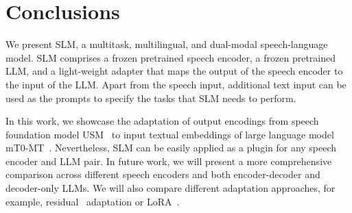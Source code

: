 \section{Conclusions}
\label{sec:conclusions}

We present SLM, a multitask, multilingual, and dual-modal speech-language model. SLM comprises a frozen pretrained speech encoder, a frozen pretrained LLM, and a light-weight adapter that maps the output of the speech encoder to the input of the LLM. Apart from the speech input, additional text input can be used as the prompts to specify the tasks that SLM needs to perform. 

In this work, we showcase the adaptation of output encodings from speech foundation model USM~\cite{zhang2023google} to input textual embeddings of large language model mT0-MT~\cite{muennighoff2022crosslingual}. Nevertheless, SLM can be easily applied as a plugin for any speech encoder and LLM pair. In future work, we will present a more comprehensive comparison across different speech encoders and both encoder-decoder and decoder-only LLMs. We will also compare different adaptation approaches, for example, residual~\cite{houlsby_etal-2019} adaptation or LoRA~\cite{hu2021lora}. 

